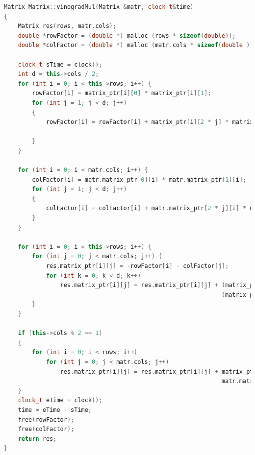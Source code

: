 \documentclass[12pt]{report}
\begin{document}
\begin{lstlisting}[label=some-code,caption=Функция умножения матриц по Винограду,language=c++]
Matrix Matrix::vinogradMul(Matrix &matr, clock_t&time)
{
    Matrix res(rows, matr.cols);
    double *rowFactor = (double *) malloc (rows * sizeof(double));
    double *colFactor = (double *) malloc (matr.cols * sizeof(double ));

    clock_t sTime = clock();
    int d = this->cols / 2;
    for (int i = 0; i < this->rows; i++) {
        rowFactor[i] = matrix_ptr[i][0] * matrix_ptr[i][1];
        for (int j = 1; j < d; j++)
        {
            rowFactor[i] = rowFactor[i] + matrix_ptr[i][2 * j] * matrix_ptr[i][2 * j + 1];

        }
    }

    for (int i = 0; i < matr.cols; i++) {
        colFactor[i] = matr.matrix_ptr[0][i] * matr.matrix_ptr[1][i];
        for (int j = 1; j < d; j++)
        {
            colFactor[i] = colFactor[i] + matr.matrix_ptr[2 * j][i] * matr.matrix_ptr[2 * j + 1][i];
        }
    }

    for (int i = 0; i < this->rows; i++) {
        for (int j = 0; j < matr.cols; j++) {
            res.matrix_ptr[i][j] = -rowFactor[i] - colFactor[j];
            for (int k = 0; k < d; k++)
                res.matrix_ptr[i][j] = res.matrix_ptr[i][j] + (matrix_ptr[i][2 * k] + matr.matrix_ptr[2 * k + 1][j]) *
                                                              (matrix_ptr[i][2 * k + 1] + matr.matrix_ptr[2 * k][j]);
        }
    }

    if (this->cols % 2 == 1)
    {
        for (int i = 0; i < rows; i++)
            for (int j = 0; j < matr.cols; j++)
                res.matrix_ptr[i][j] = res.matrix_ptr[i][j] + matrix_ptr[i][this->cols - 1] *
                                                              matr.matrix_ptr[this->cols - 1][j];
    }
    clock_t eTime = clock();
    time = eTime - sTime;
    free(rowFactor);
    free(colFactor);
    return res;
}
\end{lstlisting}
\end{document}

